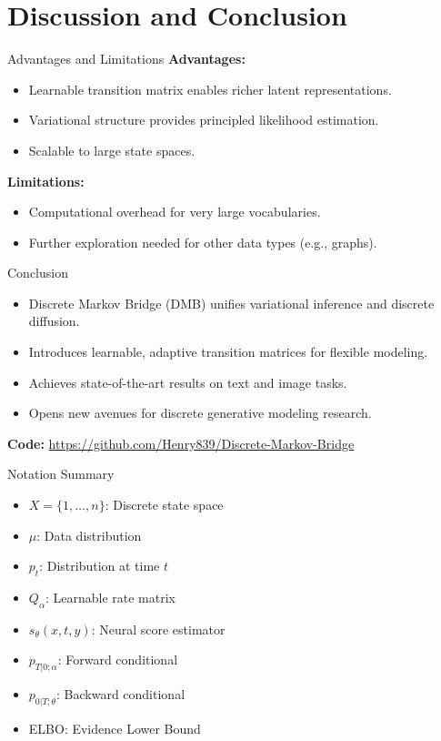 \documentclass{beamer}
\begin{document}
\section{Discussion and Conclusion}

\begin{frame}{Advantages and Limitations}
  \textbf{Advantages:}
  \begin{itemize}
    \item Learnable transition matrix enables richer latent representations.
    \item Variational structure provides principled likelihood estimation.
    \item Scalable to large state spaces.
  \end{itemize}
  \textbf{Limitations:}
  \begin{itemize}
    \item Computational overhead for very large vocabularies.
    \item Further exploration needed for other data types (e.g., graphs).
  \end{itemize}
\end{frame}

\begin{frame}{Conclusion}
  \begin{itemize}
    \item Discrete Markov Bridge (DMB) unifies variational inference and discrete diffusion.
    \item Introduces learnable, adaptive transition matrices for flexible modeling.
    \item Achieves state-of-the-art results on text and image tasks.
    \item Opens new avenues for discrete generative modeling research.
  \end{itemize}
  \vspace{1em}
  \textbf{Code:} \url{https://github.com/Henry839/Discrete-Markov-Bridge}
\end{frame}

\begin{frame}{Notation Summary}
  \begin{itemize}
    \item $X = \{1, \ldots, n\}$: Discrete state space
    \item $\mu$: Data distribution
    \item $p_t$: Distribution at time $t$
    \item $Q_\alpha$: Learnable rate matrix
    \item $s_\theta(x, t, y)$: Neural score estimator
    \item $p_{T|0;\alpha}$: Forward conditional
    \item $p_{0|T;\theta}$: Backward conditional
    \item ELBO: Evidence Lower Bound
  \end{itemize}
\end{frame}
\end{document}

